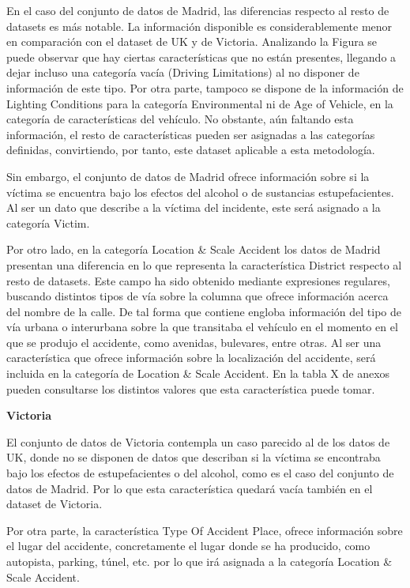 \documentclass{uathesis-es}
\begin{document}
En el caso del conjunto de datos de Madrid, las diferencias respecto al resto de datasets es más notable. La información disponible es considerablemente menor en comparación con el dataset de UK y de Victoria. Analizando la Figura se puede observar que hay ciertas características que no están presentes, llegando a dejar incluso una categoría vacía (Driving Limitations) al no disponer de información de este tipo. Por otra parte, tampoco se dispone de la información de Lighting Conditions para la categoría Environmental ni de Age of Vehicle, en la categoría de características del vehículo. No obstante, aún faltando esta información, el resto de características pueden ser asignadas a las categorías definidas, convirtiendo, por tanto, este dataset aplicable a esta metodología.

Sin embargo, el conjunto de datos de Madrid ofrece información sobre si la víctima se encuentra bajo los efectos del alcohol o de sustancias estupefacientes. Al ser un dato que describe a la víctima del incidente, este será asignado a la categoría Victim.

Por otro lado, en la categoría Location \& Scale Accident los datos de Madrid presentan una diferencia en lo que representa la característica District respecto al resto de datasets. Este campo ha sido obtenido mediante expresiones regulares, buscando distintos tipos de vía sobre la columna que ofrece información acerca del nombre de la calle. De tal forma que contiene engloba información del tipo de vía urbana o interurbana sobre la que transitaba el vehículo en el momento en el que se produjo el accidente, como avenidas, bulevares, entre otras. Al ser una característica que ofrece información sobre la localización del accidente, será incluida en la categoría de Location \& Scale Accident. En la tabla X de anexos pueden consultarse los distintos valores que esta característica puede tomar.

\textbf{Victoria}

El conjunto de datos de Victoria contempla un caso parecido al de los datos de UK, donde no se disponen de datos que describan si la víctima se encontraba bajo los efectos de estupefacientes o del alcohol, como es el caso del conjunto de datos de Madrid. Por lo que esta característica quedará vacía también en el dataset de Victoria.

Por otra parte, la característica Type Of Accident Place, ofrece información sobre el lugar del accidente, concretamente el lugar donde se ha producido, como autopista, parking, túnel, etc. por lo que irá asignada a la categoría Location \& Scale Accident.
\end{document}
